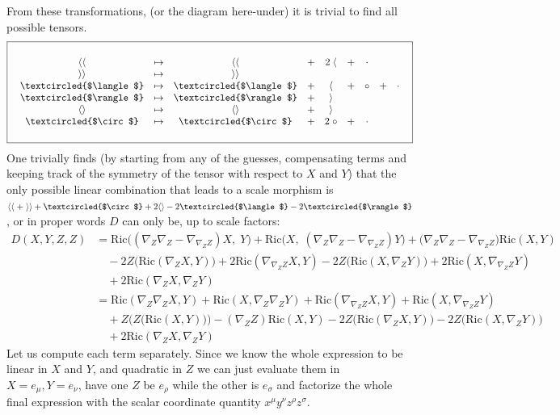 \documentclass[a4paper,11pt]{article}
\numberwithin{equation}{section}
\theoremstyle{definition}
\newcommand{\R}{{\mathrm{Ric}}}
\begin{document}
From these transformations, (or the diagram here-under) it is trivial to find all possible tensors.
\begin{equation}
\boxed{\quad \begin{matrix}
    \quad\\
    \langle\langle & \mapsto  &   \langle\langle & + & 2 \; \langle & + & \cdot \\
    \rangle\rangle & \mapsto &   \rangle\rangle \\
    \textcircled{$\langle$} & \mapsto &   \textcircled{$\langle$} & + & \langle & + & \circ & + & \cdot \\
    \textcircled{$\rangle$} & \mapsto &   \textcircled{$\rangle$} & + & \rangle  \\
    \langle\rangle & \mapsto &   \langle\rangle & + & \rangle \\
    \textcircled{$\circ$} & \mapsto &   \textcircled{$\circ$} & + & 2 \; \circ & + & \cdot\\
    \quad
\end{matrix}\quad }
\end{equation}
One trivially finds (by starting from any of the guesses, compensating terms and keeping track of the symmetry of the tensor with respect to $X$ and $Y$) that the only possible linear combination that leads to a scale morphism is $\langle\langle \; + \;\rangle\rangle+\textcircled{$\circ$} + 2 \langle\rangle - 2 \textcircled{$\langle$}- 2 \textcircled{$\rangle$}$, or in proper words $D$ can only be, up to scale factors:
\begin{align*}
    D(X,Y,Z,Z) &= \R\big((\nabla_Z\nabla_Z-\nabla_{\nabla_Z Z}) X,\;Y\big)
    + \R\big( X,\;(\nabla_Z\nabla_Z-\nabla_{\nabla_Z Z})Y\big)
    + \big(\nabla_Z\nabla_Z-\nabla_{\nabla_Z Z}\big)\R(X,Y)\\
    & \quad -2 Z\big(\R(\nabla_Z X, Y)\big)
    +2 \R(\nabla_{\nabla_ZZ} X,Y) 
    -2 Z\big(\R(X, \nabla_Z Y)\big)
    +2 \R( X,\nabla_{\nabla_ZZ}Y) \\
    & \quad + 2 \R(\nabla_Z X, \nabla_Z Y)\\
    &=\R(\nabla_Z\nabla_Z X,Y)
    + \R( X,\nabla_Z\nabla_ZY)
    + \R(\nabla_{\nabla_ZZ} X,Y)
    + \R( X,\nabla_{\nabla_ZZ}Y)\\
    & \quad + Z\big(Z\big(\R(X,Y)\big)\big)-(\nabla_Z Z)\R(X,Y)
    -2 Z\big(\R(\nabla_Z X, Y)\big)
    -2 Z\big(\R(X, \nabla_Z Y)\big) \\
    & \quad + 2 \R(\nabla_Z X, \nabla_Z Y) 
\end{align*}
Let us compute each term separately. Since we know the whole expression to be linear in $X$ and $Y$, and quadratic in $Z$ we can just evaluate them in $X=e_\mu,Y=e_\nu$, have one $Z$ be $e_\rho$ while the other is $e_\sigma$ and factorize the whole final expression with the scalar coordinate quantity $x^\mu y^\nu z^\rho z^\sigma$.
\end{document}
